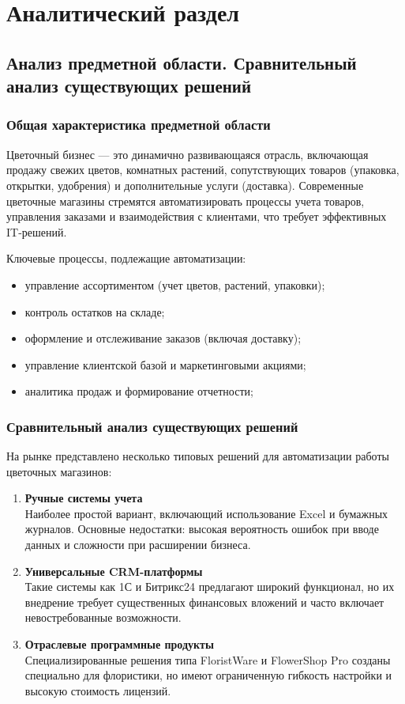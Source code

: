\chapter{Аналитический раздел}
\section{Анализ предметной области. Сравнительный анализ существующих решений}
\subsection*{Общая характеристика предметной области}
Цветочный бизнес — это динамично развивающаяся отрасль, включающая продажу свежих цветов, комнатных растений, сопутствующих товаров (упаковка, открытки, удобрения) и дополнительные услуги (доставка). Современные цветочные магазины стремятся автоматизировать процессы учета товаров, управления заказами и взаимодействия с клиентами, что требует эффективных IT-решений.

Ключевые процессы, подлежащие автоматизации:
\begin{itemize}
	\item управление ассортиментом (учет цветов, растений, упаковки);
	\item контроль остатков на складе;
	\item оформление и отслеживание заказов (включая доставку);
	\item управление клиентской базой и маркетинговыми акциями;
	\item аналитика продаж и формирование отчетности;
\end{itemize}

\subsection*{Сравнительный анализ существующих решений}

На рынке представлено несколько типовых решений для автоматизации работы цветочных магазинов:

\begin{enumerate}
\item \textbf{Ручные системы учета} \\
Наиболее простой вариант, включающий использование Excel и бумажных журналов. Основные недостатки: высокая вероятность ошибок при вводе данных и сложности при расширении бизнеса.

\item \textbf{Универсальные CRM-платформы} \\
Такие системы как 1С и Битрикс24 предлагают широкий функционал, но их внедрение требует существенных финансовых вложений и часто включает невостребованные возможности.

\item \textbf{Отраслевые программные продукты} \\
Специализированные решения типа FloristWare и FlowerShop Pro созданы специально для флористики, но имеют ограниченную гибкость настройки и высокую стоимость лицензий.
\end{enumerate}


